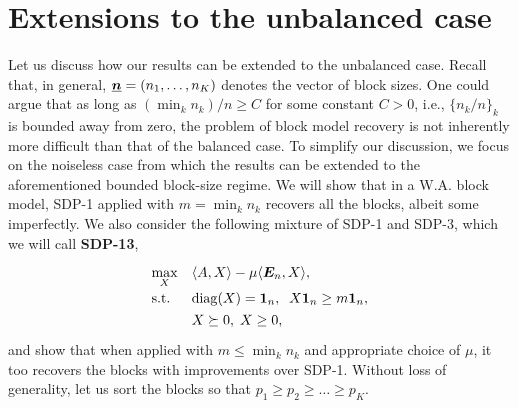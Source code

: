 \section{Extensions to the unbalanced case}
\label{sec:unbalanced:extension}
Let us discuss how our results can be extended to the unbalanced case. Recall that, in general, ${\underline{\bm{n}}}
= (n_1,\dots,n_K)$ denotes the vector of block sizes. One could argue that as long as $(\min_k n_k) / n\ge C$ for some constant $C > 0$, i.e., $\{n_k/n\}_k$ is bounded away from zero, the problem of block model recovery is not inherently more difficult than that of the balanced case. To simplify our discussion, we focus on the noiseless case from which the results can be extended to the aforementioned bounded block-size regime.
We will show that in a W.A. block model, SDP-1 applied with $m = \min_k n_k$ recovers all the blocks, albeit some imperfectly. We also consider the following mixture of SDP-1 and SDP-3, which we will call \textbf{SDP-13},
\begin{align}\label{eq:sdp:13}
	\begin{split}
		\renewcommand{\arraystretch}{1.3}
			\begin{array}{ll}
			\max\limits_{X} & \ip{A,X} - \mu \ip{\onem_n,X}, \\
			\text{s.t.} & \diag(X) = \onev_n, \;\; X \onev_n \ge m \onev_n, \\
			&X \succeq 0, \; X \ge 0,
		\end{array}
	\end{split}
\end{align}
and show that when applied with $m \le \min_k n_k$ and appropriate choice of $\mu$, it too recovers the blocks with improvements over SDP-1.
%
Without loss of generality, let us sort the blocks so that $p_1 \ge p_2 \ge \dots \ge p_K$.
